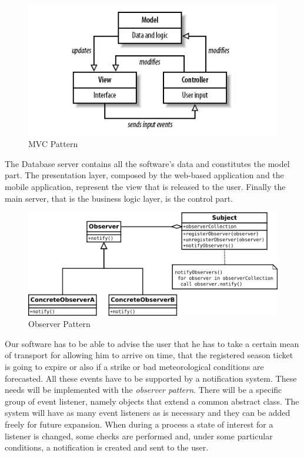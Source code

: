 
\begin{figure}[H]
	\centering
	\includegraphics[scale=0.4]{Images/Patterns/MVC_Pattern}
	\caption{MVC Pattern}
\end{figure}
The Database server contains all the software’s data and constitutes the model part. The presentation layer, composed by the web-based application and the mobile application, represent the view that is released to the user. Finally the main server,  that is the business logic layer, is the control part.

\begin{figure}[H]
	\centering
	\includegraphics[scale=0.45]{Images/Patterns/Observer_Pattern}
	\caption{Observer Pattern}
\end{figure}
Our software has to be able to advise the user that he has to take a certain mean of transport for allowing him to arrive on time, that the registered season ticket is going to expire or also if a strike or bad meteorological conditions are forecasted. All these events have to be supported by a notification system. These needs will be implemented with the \emph{observer pattern}.  There will be a specific group of event listener, namely objects that extend a common abstract class. The system will have as many event listeners as is necessary and they can be added freely for future expansion. When during a process a state of interest for a listener is changed, some checks are performed and, under some particular conditions, a notification is created and sent to the user. 

